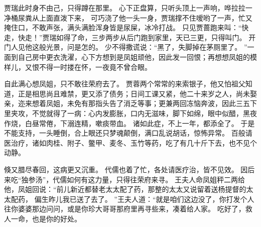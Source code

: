 贾瑞此时身不由己，只得蹲在那里。
心下正盘算，只听头顶上一声响，哗拉拉一净桶尿粪从上面直泼下来，
可巧浇了他一头一身，贾瑞撑不住嗳哟了一声，忙又掩住口，不敢声张，满头满脸浑身皆是尿屎，冰冷打战。
只见贾蔷跑来叫：“快走，快走！”贾瑞如得了命，三步两步从后门跑到家里，天已三更，只得叫门。
开门人见他这般光景，问是怎的。
少不得撒谎说：“黑了，失脚掉在茅厕里了。
”一面到自己房中更衣洗濯，心下方想到是凤姐顽他，因此发一回恨；再想想凤姐的模样儿，又恨不得一时搂在怀，一夜竟不曾合眼。
\par
自此满心想凤姐，只不敢往荣府去了。
贾蓉两个常常的来索银子，他又怕祖父知道，正是相思尚且难禁，更又添了债务；日间工课又紧，他二十来岁之人，尚未娶亲，迩来想着凤姐，未免有那指头告了消乏等事；更兼两回冻恼奔波，因此三五下里夹攻，不觉就得了一病：心内发膨胀，口内无滋味，脚下如绵，眼中似醋，黑夜作烧，白昼常倦，下溺连精，嗽痰带血。
诸如此症，不上一年，都添全了。
于是不能支持，一头睡倒，合上眼还只梦魂颠倒，满口乱说胡话，惊怖异常。
百般请医治疗，诸如肉桂、附子、鳖甲、麦冬、玉竹等药，吃了有几十斤下去，也不见个动静。
\par
倏又腊尽春回，这病更又沉重。
代儒也着了忙，各处请医疗治，皆不见效。
因后来吃“独参汤”，代儒如何有这力量，只得往荣府来寻。
王夫人命凤姐秤二两给他，凤姐回说：“前儿新近都替老太太配了药，那整的太太又说留着送杨提督的太太配药，
偏生昨儿我已送了去了。
”王夫人道：“就是咱们这边没了，你打发个人往你婆婆那边问问，或是你珍大哥哥那府里再寻些来，凑着给人家。
吃好了，救人一命，也是你的好处。
